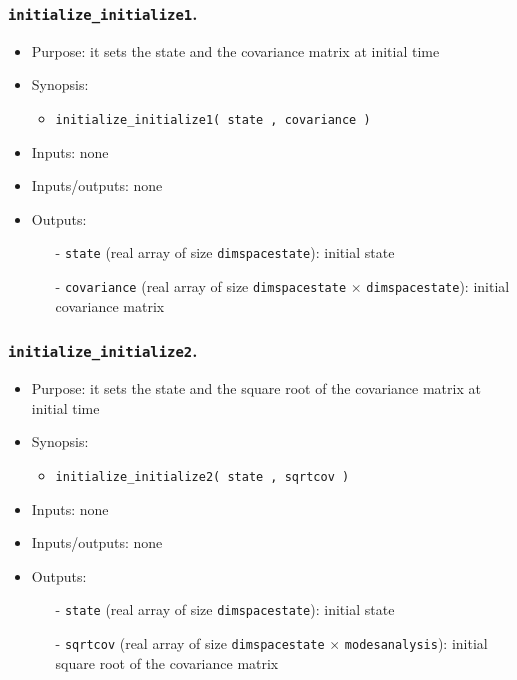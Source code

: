 \documentclass[12pt]{article}
\begin{document}
\subsubsection{{\tt initialize\_initialize1}.}
\begin{itemize}
\item Purpose: it sets the state and the covariance matrix at initial time
\item Synopsis: 
\begin{itemize}
\item {\tt initialize\_initialize1( state , covariance )}
\end{itemize}
\item Inputs: none
\item Inputs/outputs: none
\item Outputs: 
\begin{itemize}
\item[-] {\tt state} (real array of size {\tt dimspacestate}): initial state
\item[-] {\tt covariance} (real array of size {\tt dimspacestate} $\times$ {\tt dimspacestate}): initial covariance matrix
\end{itemize}
\end{itemize} 

\subsubsection{{\tt initialize\_initialize2}.}
\begin{itemize}
\item Purpose: it sets the state and the square root of the covariance matrix at initial time
\item Synopsis: 
\begin{itemize}
\item {\tt initialize\_initialize2( state , sqrtcov )}
\end{itemize}
\item Inputs: none
\item Inputs/outputs: none
\item Outputs: 
\begin{itemize}
\item[-] {\tt state} (real array of size {\tt dimspacestate}): initial state
\item[-] {\tt sqrtcov} (real array of size {\tt dimspacestate} $\times$ {\tt modesanalysis}): initial square root of the covariance matrix
\end{itemize}
\end{itemize} 
\end{document}
